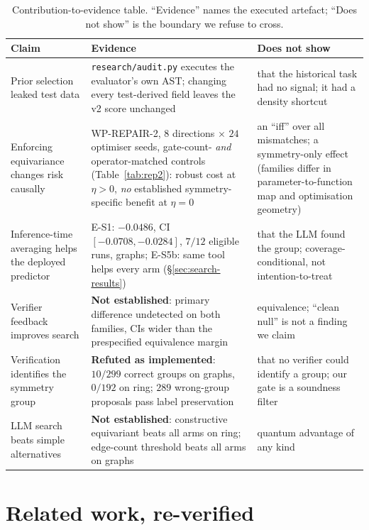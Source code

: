 \documentclass[11pt]{article}
\begin{document}
\begin{table}[t]
\centering
\caption{Contribution-to-evidence table. ``Evidence'' names the executed artefact;
``Does not show'' is the boundary we refuse to cross.}
\label{tab:contribution}
\small
\begin{tabular}{@{}p{}p{}p{}@{}}
\toprule
Claim & Evidence & Does not show \\
\midrule
Prior selection leaked test data &
\texttt{research/audit.py} executes the evaluator's own AST; changing every test-derived
field leaves the v2 score unchanged &
that the historical task had no signal; it had a density shortcut \\
\midrule
Enforcing equivariance changes risk causally &
WP-REPAIR-2, $8$ directions $\times$ $24$ optimiser seeds, gate-count- \emph{and}
operator-matched controls (Table~\ref{tab:rep2}): robust cost at $\eta{>}0$, \emph{no}
established symmetry-specific benefit at $\eta{=}0$ &
an ``iff'' over all mismatches; a symmetry-only effect (families differ in
parameter-to-function map and optimisation geometry) \\
\midrule
Inference-time averaging helps the deployed predictor &
E-S1: $-0.0486$, CI $[-0.0708,-0.0284]$, $7/12$ eligible runs, graphs; E-S5b: same tool
helps every arm (\S\ref{sec:search-results}) &
that the LLM found the group; coverage-conditional, not intention-to-treat \\
\midrule
Verifier feedback improves search &
\textbf{Not established}: primary difference undetected on both families, CIs wider than
the prespecified equivalence margin &
equivalence; ``clean null'' is not a finding we claim \\
\midrule
Verification identifies the symmetry group &
\textbf{Refuted as implemented}: $10/299$ correct groups on graphs, $0/192$ on ring;
$289$ wrong-group proposals pass label preservation &
that no verifier could identify a group; our gate is a soundness filter \\
\midrule
LLM search beats simple alternatives &
\textbf{Not established}: constructive equivariant beats all arms on ring; edge-count
threshold beats all arms on graphs &
quantum advantage of any kind \\
\bottomrule
\end{tabular}
\end{table}

\section{Related work, re-verified}
\label{sec:related}
\end{document}
